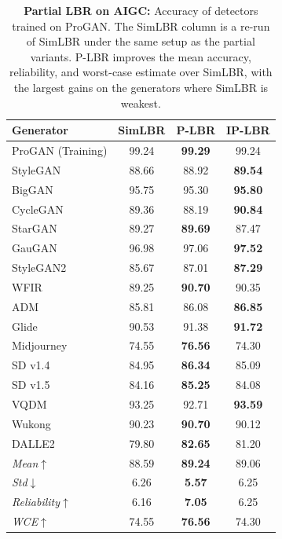 \begin{table}[!t]
\centering
\small
\begin{tabular}{l|ccc}
\hline
Generator & SimLBR & P-LBR & IP-LBR \\
\hline
ProGAN (Training) & 99.24 & \textbf{99.29} & 99.24 \\
\hline
StyleGAN   & 88.66 & 88.92 & \textbf{89.54} \\
BigGAN     & 95.75 & 95.30 & \textbf{95.80} \\
CycleGAN   & 89.36 & 88.19 & \textbf{90.84} \\
StarGAN    & 89.27 & \textbf{89.69} & 87.47 \\
GauGAN     & 96.98 & 97.06 & \textbf{97.52} \\
StyleGAN2  & 85.67 & 87.01 & \textbf{87.29} \\
WFIR       & 89.25 & \textbf{90.70} & 90.35 \\
ADM        & 85.81 & 86.08 & \textbf{86.85} \\
Glide      & 90.53 & 91.38 & \textbf{91.72} \\
Midjourney & 74.55 & \textbf{76.56} & 74.30 \\
SD v1.4    & 84.95 & \textbf{86.34} & 85.09 \\
SD v1.5    & 84.16 & \textbf{85.25} & 84.08 \\
VQDM       & 93.25 & 92.71 & \textbf{93.59} \\
Wukong     & 90.23 & \textbf{90.70} & 90.12 \\
DALLE2     & 79.80 & \textbf{82.65} & 81.20 \\
\hline
\textit{Mean}$\uparrow$        & 88.59 & \textbf{89.24} & 89.06 \\
\textit{Std}$\downarrow$         & 6.26 & \textbf{5.57} & 6.25 \\
\textit{Reliability}$\uparrow$ & 6.16 & \textbf{7.05} & 6.25 \\
\textit{WCE}$\uparrow$         & 74.55 & \textbf{76.56} & 74.30 \\
\hline
\end{tabular}
\caption{\textbf{Partial LBR on AIGC:} Accuracy of detectors trained on ProGAN. The SimLBR column is a re-run of SimLBR under the same setup as the partial variants. P-LBR improves the mean accuracy, reliability, and worst-case estimate over SimLBR, with the largest gains on the generators where SimLBR is weakest. }
\label{table:plbr_aigc}
\end{table}

